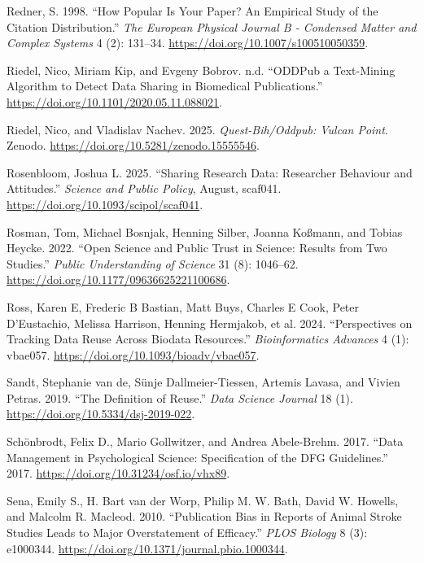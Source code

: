 \documentclass[
  letterpaper,
  DIV=11,
  numbers=noendperiod]{scrartcl}
\newlength{\cslhangindent}
\newenvironment{CSLReferences}[2] %
 {\begin{list}{}{%
  \setlength{\itemindent}{0pt}
  \setlength{\leftmargin}{0pt}
  \setlength{\parsep}{0pt}
  \ifodd #1
   \setlength{\leftmargin}{\cslhangindent}
   \setlength{\itemindent}{-1\cslhangindent}
  \fi
  \setlength{\itemsep}{#2\baselineskip}}}
 {\end{list}}
\begin{document}
\begin{CSLReferences}{1}{0}
Redner, S. 1998. {``How Popular Is Your Paper? An Empirical Study of the
Citation Distribution.''} \emph{The European Physical Journal B -
Condensed Matter and Complex Systems} 4 (2): 131--34.
\url{https://doi.org/10.1007/s100510050359}.

Riedel, Nico, Miriam Kip, and Evgeny Bobrov. n.d. {``ODDPub
{\textendash} a Text-Mining Algorithm to Detect Data Sharing in
Biomedical Publications.''}
\url{https://doi.org/10.1101/2020.05.11.088021}.

Riedel, Nico, and Vladislav Nachev. 2025. \emph{Quest-Bih/Oddpub: Vulcan
Point}. Zenodo. \url{https://doi.org/10.5281/zenodo.15555546}.

Rosenbloom, Joshua L. 2025. {``Sharing Research Data: Researcher
Behaviour and Attitudes.''} \emph{Science and Public Policy}, August,
scaf041. \url{https://doi.org/10.1093/scipol/scaf041}.

Rosman, Tom, Michael Bosnjak, Henning Silber, Joanna Koßmann, and Tobias
Heycke. 2022. {``Open Science and Public Trust in Science: Results from
Two Studies.''} \emph{Public Understanding of Science} 31 (8): 1046--62.
\url{https://doi.org/10.1177/09636625221100686}.

Ross, Karen E, Frederic B Bastian, Matt Buys, Charles E Cook, Peter
D'Eustachio, Melissa Harrison, Henning Hermjakob, et al. 2024.
{``Perspectives on Tracking Data Reuse Across Biodata Resources.''}
\emph{Bioinformatics Advances} 4 (1): vbae057.
\url{https://doi.org/10.1093/bioadv/vbae057}.

Sandt, Stephanie van de, Sünje Dallmeier-Tiessen, Artemis Lavasa, and
Vivien Petras. 2019. {``The Definition of Reuse.''} \emph{Data Science
Journal} 18 (1). \url{https://doi.org/10.5334/dsj-2019-022}.

Schönbrodt, Felix D., Mario Gollwitzer, and Andrea Abele-Brehm. 2017.
{``Data {Management} in {Psychological Science}: {Specification} of the
{DFG Guidelines}.''} 2017. \url{https://doi.org/10.31234/osf.io/vhx89}.

Sena, Emily S., H. Bart van der Worp, Philip M. W. Bath, David W.
Howells, and Malcolm R. Macleod. 2010. {``Publication {Bias} in
{Reports} of {Animal Stroke Studies Leads} to {Major Overstatement} of
{Efficacy}.''} \emph{PLOS Biology} 8 (3): e1000344.
\url{https://doi.org/10.1371/journal.pbio.1000344}.


\end{CSLReferences}
\end{document}
